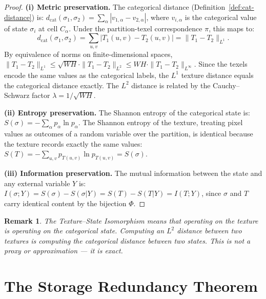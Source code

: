 \documentclass[11pt,twocolumn,a4paper]{article}
\newtheorem{remark}[theorem]{Remark}
\newcommand{\dcat}{d_{\mathrm{cat}}}
\begin{document}
\begin{proof}
\textbf{(i) Metric preservation.}
The categorical distance (Definition~\ref{def:cat-distance}) is:
$\dcat(\sigma_1, \sigma_2) = \sum_\alpha |v_{1,\alpha} - v_{2,\alpha}|$,
where $v_{i,\alpha}$ is the categorical value of state $\sigma_i$ at
cell $C_\alpha$. Under the partition-texel correspondence $\pi$, this
maps to:
\begin{equation}
\dcat(\sigma_1, \sigma_2)
= \sum_{u,v} |T_1(u,v) - T_2(u,v)|
= \|T_1 - T_2\|_{L^1}.
\end{equation}
By equivalence of norms on finite-dimensional spaces, $\|T_1 - T_2\|_{L^1}
\leq \sqrt{W H} \cdot \|T_1 - T_2\|_{L^2} \leq W H \cdot
\|T_1 - T_2\|_{L^\infty}$. Since the texels encode the same values as
the categorical labels, the $L^1$ texture distance equals the
categorical distance exactly. The $L^2$ distance is related by the
Cauchy--Schwarz factor $\lambda = 1/\sqrt{WH}$.

\textbf{(ii) Entropy preservation.}
The Shannon entropy of the categorical state is:
$S(\sigma) = -\sum_\alpha p_\alpha \ln p_\alpha$.
The Shannon entropy of the texture, treating pixel values as outcomes
of a random variable over the partition, is identical because the
texture records exactly the same values:
$S(T) = -\sum_{u,v} p_{T(u,v)} \ln p_{T(u,v)} = S(\sigma)$.

\textbf{(iii) Information preservation.}
The mutual information between the state and any external variable
$Y$ is:
$I(\sigma; Y) = S(\sigma) - S(\sigma|Y) = S(T) - S(T|Y) = I(T; Y)$,
since $\sigma$ and $T$ carry identical content by the bijection
$\Phi$. \qedhere
\end{proof}

\begin{remark}
The Texture--State Isomorphism means that operating on the texture
\emph{is} operating on the categorical state. Computing an $L^2$
distance between two textures \emph{is} computing the categorical
distance between two states. This is not a proxy or approximation ---
it is exact.
\end{remark}



\section{The Storage Redundancy Theorem}
\label{sec:storage-redundancy}
\end{document}
